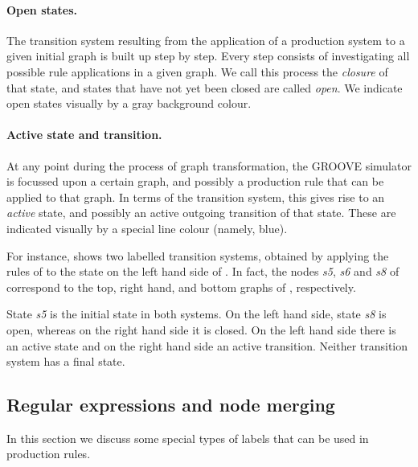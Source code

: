 \paragraph{Open states.}

The transition system resulting from the application of a production system to
a given initial graph is built up step by step. Every step consists of
investigating all possible rule applications in a given graph. We call this
process the \emph{closure} of that state, and states that have not yet been
closed are called \emph{open}. We indicate open states visually by a gray
background colour.

\paragraph{Active state and transition.}

At any point during the process of graph transformation, the GROOVE
simulator is focussed upon a certain graph, and possibly a production rule
that can be applied to that graph. In terms of the transition system, this
gives rise to an \emph{active} state, and possibly an active outgoing
transition of that state. These are indicated visually by a special line
colour (namely, blue).


For instance,  shows two labelled transition systems, obtained by
applying the rules of  to the state on the left hand
side of . In fact, the nodes \emph{s5}, \emph{s6} and \emph{s8}
of  correspond to the top, right hand, and bottom graphs of
, respectively.

State \emph{s5} is the initial state in both systems. On the left hand side,
state \emph{s8} is open, whereas on the right hand side it is closed.  On the
left hand side there is an active state and on the right hand side an active
transition. Neither transition system has a final state.

\subsection{Regular expressions and node merging}

In this section we discuss some special types of labels that can be used in
production rules.

